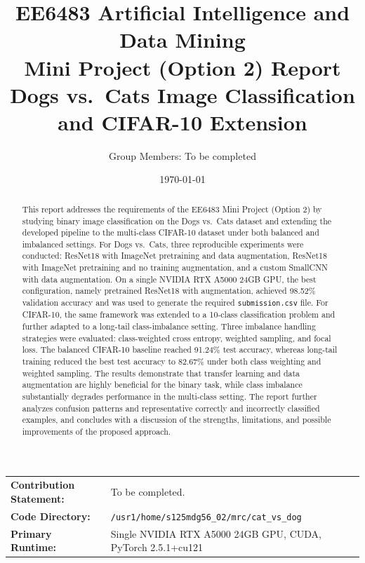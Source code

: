 \documentclass[11pt,a4paper]{article}
\title{\textbf{EE6483 Artificial Intelligence and Data Mining}\\Mini Project (Option 2) Report\\[0.4em]\large Dogs vs.\ Cats Image Classification and CIFAR-10 Extension}
\author{Group Members: To be completed}
\date{\today}
\begin{document}
\maketitle

\begin{center}
\begin{tabularx}{0.95\textwidth}{>{\raggedright\arraybackslash}p{}X}
\textbf{Contribution Statement:} & To be completed. \\
\textbf{Code Directory:} & \texttt{/usr1/home/s125mdg56\_02/mrc/cat\_vs\_dog} \\
\textbf{Primary Runtime:} & Single NVIDIA RTX A5000 24GB GPU, CUDA, PyTorch 2.5.1+cu121 \\
\end{tabularx}
\end{center}

\begin{abstract}
This report addresses the requirements of the EE6483 Mini Project (Option 2) by studying binary image classification on the Dogs vs.\ Cats dataset and extending the developed pipeline to the multi-class CIFAR-10 dataset under both balanced and imbalanced settings. For Dogs vs.\ Cats, three reproducible experiments were conducted: ResNet18 with ImageNet pretraining and data augmentation, ResNet18 with ImageNet pretraining and no training augmentation, and a custom SmallCNN with data augmentation. On a single NVIDIA RTX A5000 24GB GPU, the best configuration, namely pretrained ResNet18 with augmentation, achieved 98.52\% validation accuracy and was used to generate the required \texttt{submission.csv} file. For CIFAR-10, the same framework was extended to a 10-class classification problem and further adapted to a long-tail class-imbalance setting. Three imbalance handling strategies were evaluated: class-weighted cross entropy, weighted sampling, and focal loss. The balanced CIFAR-10 baseline reached 91.24\% test accuracy, whereas long-tail training reduced the best test accuracy to 82.67\% under both class weighting and weighted sampling. The results demonstrate that transfer learning and data augmentation are highly beneficial for the binary task, while class imbalance substantially degrades performance in the multi-class setting. The report further analyzes confusion patterns and representative correctly and incorrectly classified examples, and concludes with a discussion of the strengths, limitations, and possible improvements of the proposed approach.
\end{abstract}
\end{document}
